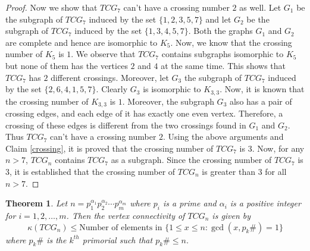 \documentclass[12pt]{article}
\newtheorem{theorem}{Theorem}[section]
\begin{document}
\begin{proof}
		Now we show that $TCG_7$ can't have a crossing number $2$ as well. Let $G_1$ be the subgraph of $TCG_7$ induced by the set $\{1,2,3,5,7\}$ and let $G_2$ be the subgraph of $TCG_7$ induced by the set $\{1,3,4,5,7\}$.
		Both the graphs $G_1$ and $G_2$ are complete and hence are isomorphic to $K_5$.
		Now, we know that the crossing number of $K_5$ is $1$.
		We observe that $TCG_7$ contains subgraphs isomorphic to $K_5$ but none of them has the vertices $2$ and $4$ at the same time.
		This shows that $TCG_7$ has $2$ different crossings. Moreover, let $G_3$ the subgraph of $TCG_7$ induced by the set $\{2,6,4,1,5,7\}$. Clearly $G_3$ is isomorphic to $K_{3,3}$. Now, it is known that the crossing number of $K_{3,3}$ is $1$. Moreover, the subgraph $G_3$ also has a pair of crossing edges, and each edge of it has exactly one even vertex. Therefore, a crossing of these edges is different from the two crossings found in $G_1$ and $G_2$.
		Thus $TCG_7$ can't have a crossing number $2$. 
		Using the above arguments and  Claim \ref{crossing}, it is proved that the crossing number of $TCG_7$ is $3$. 
		Now, for any $n>7$, $TCG_n$ contains $TCG_7$ as a subgraph. Since the crossing number of $TCG_7$ is $3$, it is established that the crossing number of $TCG_n$ is greater than $3$ for all $n>7.$
		
	\end{proof}
	
	\begin{theorem}
		
		Let $n=p_1^{\alpha_1}p_2^{\alpha_2}\cdots p_m^{\alpha_m}$ where $p_i$ is  a prime and $\alpha_i$ is a positive integer for $i=1,2, \ldots, m$. Then the vertex connectivity of $TCG_n$ is given by
		$$\kappa(TCG_n)\le \text{Number of elements in } \{1\le x\le n:\gcd(x,p_k\#)=1\}$$ where $p_k\#$ is the $k^{th}$ primorial such that $p_k\#\le n$.
		
	\end{theorem}
	
\end{document}
